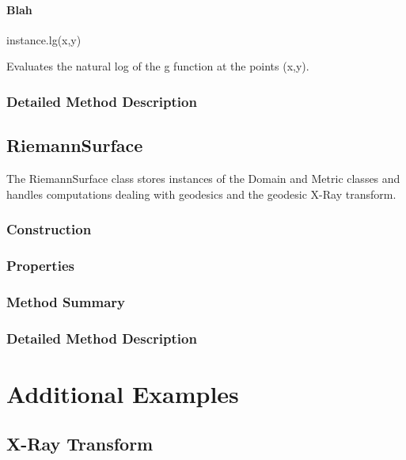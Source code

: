 \documentclass[10pt]{article}
\newenvironment{codetext} { 
\fontfamily{qcr}\selectfont 
}%
{  }
\newcommand{\methodbr}{\hfill\vspace{5pt}\linebreak}
\newenvironment{methodInfo}[1]{%
  \methodbr \begin{codetext} #1 \end{codetext} \vspace*{-5pt}
  \begin{center}\begin{minipage}[t]{0.9\textwidth}
}
{\end{minipage}\end{center} \vspace*{-15pt}}
\begin{document}
			\paragraph{Blah}
				\begin{methodInfo}{instance.lg(x,y)}
					Evaluates the natural log of the g function at the points (x,y).
				\end{methodInfo}
		\subsubsection{Detailed Method Description}
	 	
	\newpage 
	\subsection{RiemannSurface}
		The RiemannSurface class stores instances of the Domain and Metric classes and handles computations dealing with geodesics and the geodesic X-Ray transform.
		\subsubsection{Construction}
		
		\subsubsection{Properties}		
		
		\subsubsection{Method Summary}
		
		\subsubsection{Detailed Method Description}
		

\newpage
\section{Additional Examples}

	\subsection{X-Ray Transform}
\end{document}
